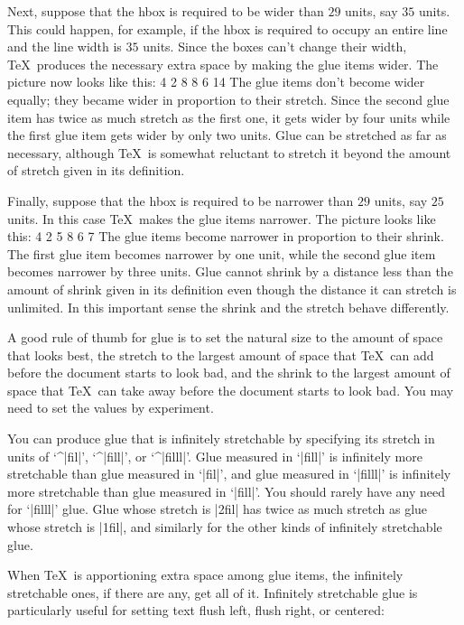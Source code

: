 {{{{{{Next, suppose that the hbox is required to be wider than $29$ units, say
$35$ units.  This
could happen, for example, if the hbox is required to occupy an entire
line and the line width is $35$ units.
Since the boxes can't change their width,
\TeX\ produces the necessary extra space by making the glue items wider.
The picture now looks like this:
 {  4 2 8   8 6 14  }
The glue items don't become wider equally; they became wider in proportion to
their stretch.  Since the second glue item
has twice as much stretch as the first one,
it gets wider by four units while the first glue item gets wider by only
two units.
Glue can be stretched as far as necessary, although \TeX\ is
somewhat reluctant to
stretch it beyond the amount of stretch given in its definition.

Finally, suppose that the hbox is required to be narrower than $29$ units, say
$25$ units.  In this case \TeX\ makes the glue items narrower.
The picture looks like this:
 {  4 2 5   8 6 7  }
The glue items become narrower in proportion to their shrink.
The first glue item becomes narrower by one unit, while the second glue item
becomes narrower by three units.  Glue cannot shrink by a distance
less than the amount of shrink
given in its definition even though the distance it can stretch is
unlimited.  In this important sense the shrink and
the stretch behave differently.

A good rule of thumb for glue is to set the natural size to the amount
of space that looks best, the stretch to the largest amount of space
that \TeX\ can add before the document starts to look bad, and the
shrink to the largest amount of space that \TeX\ can take away before
the document starts to look bad.  You may need to set the values by
experiment.

You can produce glue that is infinitely stretchable  by specifying
its stretch in units of `^|fil|', `^|fill|', or `^|filll|'.   Glue measured in
`|fill|' is infinitely more stretchable than glue measured in `|fil|', and
glue measured in `|filll|'  is infinitely more stretchable than glue measured
in `|fill|'.  You should rarely have any need for `|filll|' glue.  Glue whose
stretch is |2fil| has twice as much stretch as glue whose stretch is |1fil|,
and similarly for the other kinds of infinitely stretchable glue.

When \TeX\ is
apportioning extra space among glue items, the infinitely stretchable
ones, if there
are any, get all of it.  Infinitely stretchable glue is particularly useful for
setting text flush left, flush right, or centered:

}}}}}}
